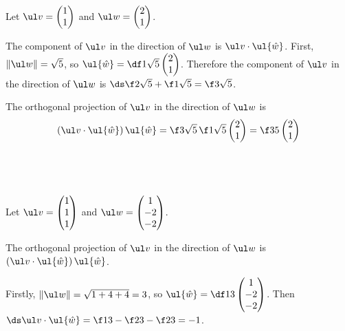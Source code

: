 \documentclass[a4paper]{article}
\begin{document}

\subsection{~}

Let $\ul v = \begin{pmatrix}1\\ 1\end{pmatrix}$ and $\ul w = \begin{pmatrix}2\\ 1\end{pmatrix}$.

The component of $\ul v$ in the direction of $\ul w$ is $\ul v \cdot \ul{\hat w}$. First, $\|\ul w\| = \sqrt5$, so $\ul{\hat w} = \df1{\sqrt5} \begin{pmatrix}2\\ 1\end{pmatrix}$. Therefore the component of $\ul v$ in the direction of $\ul w$ is $\ds \f2{\sqrt5} + \f1{\sqrt5} = \f3{\sqrt5}$.

The orthogonal projection of $\ul v$ in the direction of $\ul w$ is $$(\ul v \cdot \ul{\hat w})\, \ul{\hat w} = \f3{\sqrt5}\, \f1{\sqrt5} \begin{pmatrix}2\\ 1\end{pmatrix} = \f35 \begin{pmatrix}2\\ 1\end{pmatrix}$$

\subsection{~}

Let $\ul v = \begin{pmatrix}1\\ 1\\ 1\end{pmatrix}$ and $\ul w = \begin{pmatrix}1\\ -2\\ -2\end{pmatrix}$.

The orthogonal projection of $\ul v$ in the direction of $\ul w$ is $(\ul v \cdot \ul{\hat w})\, \ul{\hat w}$.

Firstly, $\|\ul w\| = \sqrt{1+4+4} = 3$, so $\ul{\hat w} = \df13 \begin{pmatrix}1\\ -2\\ -2\end{pmatrix}$. Then $\ds \ul v \cdot \ul{\hat w} = \f13 - \f23 - \f23 = -1$.
\end{document}
